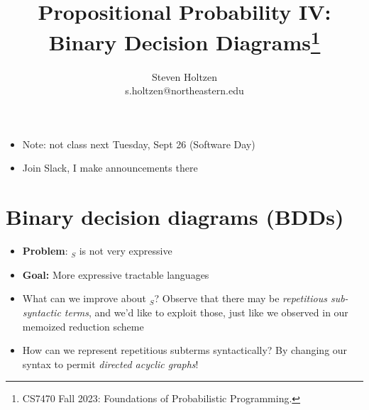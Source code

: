 \documentclass{tufte-handout}
\title{Propositional Probability IV:\\Binary Decision Diagrams\thanks{CS7470 Fall 2023: Foundations of Probabilistic Programming.}}
\author[]{Steven Holtzen\\s.holtzen@northeastern.edu}
\begin{document}
\maketitle%
\begin{itemize}
  \item Note: not class next Tuesday, Sept 26 (Software Day)
  \item Join Slack, I make announcements there
\end{itemize}

\section{Binary decision diagrams (BDDs)}
\begin{itemize}
  \item \textbf{Problem}: \prop$_S${} is not very expressive
  \item \textbf{Goal:} More expressive tractable languages
  \item What can we improve about \prop$_S$? Observe that there may be 
  \emph{repetitious sub-syntactic terms}, and we'd like to exploit those, just
  like we observed in our memoized reduction scheme
  \item How can we represent repetitious subterms syntactically? By changing our 
  syntax to permit \emph{directed acyclic graphs}!


\end{itemize}
\end{document}

